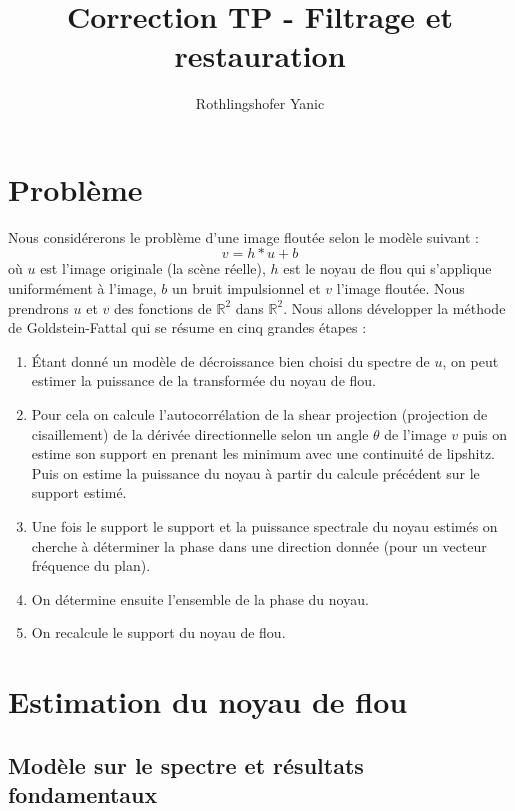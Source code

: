 \documentclass[a4paper,11pt]{article}
\title{Correction TP - Filtrage et restauration}
\author{Rothlingshofer Yanic}
\begin{document}
\maketitle

\section{Problème}
Nous considérerons le problème d'une image floutée selon le modèle suivant : 
$$v = h*u + b$$
où $u$ est l'image originale (la scène réelle), $h$ est le noyau de flou qui s'applique uniformément à l'image, $b$ un bruit impulsionnel et $v$ l'image floutée. Nous prendrons $u$ et $v$ des fonctions de $\mathbb{R}^2$ dans $\mathbb{R}^2$. Nous allons développer la méthode de Goldstein-Fattal qui se résume en cinq grandes étapes : 
\begin{enumerate}
\item Étant donné un modèle de décroissance bien choisi du spectre de $u$, on peut estimer la puissance de la transformée du noyau de flou.
\item Pour cela on calcule l'autocorrélation de la shear projection (projection de cisaillement) de la dérivée directionnelle selon un angle $\theta$ de l'image $v$ puis on estime son support en prenant les minimum avec une continuité de lipshitz. Puis on estime la puissance du noyau à partir du calcule précédent sur le support estimé.
\item Une fois le support le support et la puissance spectrale du noyau estimés on cherche à déterminer la phase dans une direction donnée (pour un vecteur fréquence du plan).
\item On détermine ensuite l'ensemble de la phase du noyau.
\item On recalcule le support du noyau de flou.
\end{enumerate}


\section{Estimation du noyau de flou}

\subsection{Modèle sur le spectre et résultats fondamentaux}
\end{document}

